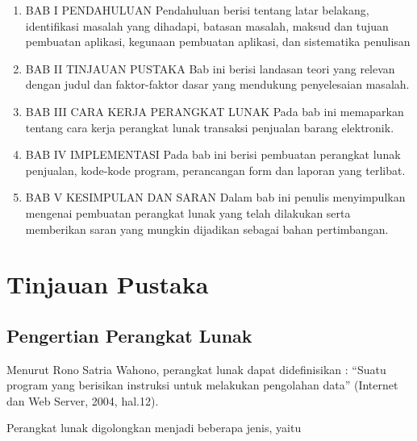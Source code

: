 \documentclass{article}
\begin{document}
\begin{enumerate}
    \item BAB I 	PENDAHULUAN \newline
    Pendahuluan berisi tentang latar belakang, identifikasi masalah yang dihadapi, batasan masalah, maksud dan tujuan pembuatan aplikasi, kegunaan pembuatan aplikasi, dan sistematika penulisan
    \item BAB II	TINJAUAN PUSTAKA \newline
    Bab ini berisi landasan teori yang relevan dengan judul dan faktor-faktor dasar yang mendukung penyelesaian masalah.
    \item BAB III	CARA KERJA PERANGKAT LUNAK \newline
    Pada bab ini memaparkan tentang  cara kerja perangkat lunak transaksi penjualan barang elektronik.
    \item BAB IV	IMPLEMENTASI \newline
    Pada bab ini berisi pembuatan perangkat lunak  penjualan, kode-kode program, perancangan form dan laporan yang terlibat.
    \item BAB V	KESIMPULAN DAN SARAN \newline
    Dalam bab ini penulis menyimpulkan mengenai pembuatan perangkat lunak yang telah dilakukan serta memberikan saran yang mungkin dijadikan sebagai bahan pertimbangan.
\end{enumerate}

\section{Tinjauan Pustaka}
\subsection{Pengertian Perangkat Lunak}
Menurut Rono Satria Wahono, perangkat lunak dapat didefinisikan : “Suatu program yang berisikan instruksi untuk melakukan pengolahan  data” (Internet dan Web Server, 2004, hal.12).

Perangkat lunak digolongkan menjadi beberapa jenis, yaitu
\end{document}
